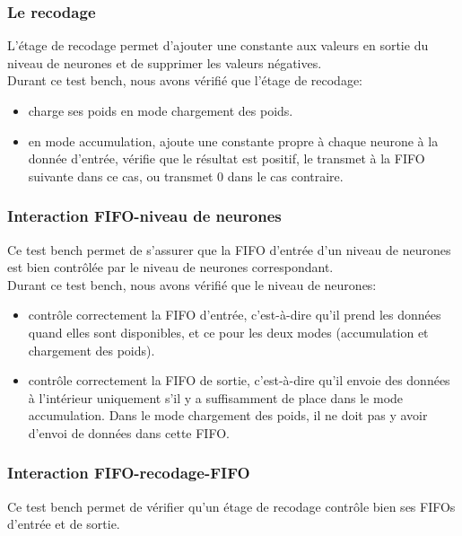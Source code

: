\subsubsection{Le recodage}

L'étage de recodage permet d'ajouter une constante aux valeurs en sortie du
niveau de neurones et de supprimer les valeurs négatives.\\

Durant ce test bench, nous avons vérifié que l'étage de recodage:
\begin{itemize}
	\item charge ses poids en mode chargement des poids.
	\item en mode accumulation, ajoute une constante propre à chaque neurone
	à la donnée d'entrée, vérifie que le résultat est positif, le transmet à
	la FIFO suivante dans ce cas, ou transmet 0 dans le cas contraire.
\end{itemize}

\subsubsection{Interaction FIFO-niveau de neurones}

Ce test bench permet de s'assurer que la FIFO d'entrée d'un niveau de neurones
est bien contrôlée par le niveau de neurones correspondant.\\

Durant ce test bench, nous avons vérifié que le niveau de neurones:
\begin{itemize}
	\item contrôle correctement la FIFO d'entrée, c'est-à-dire qu'il prend
	les données quand elles sont disponibles, et ce pour les deux modes
	(accumulation et chargement des poids).
	\item contrôle correctement la FIFO de sortie, c'est-à-dire qu'il envoie
	des données à l'intérieur uniquement s'il y a suffisamment de place dans
	le mode accumulation. Dans le mode chargement des poids, il ne doit pas
	y avoir d'envoi de données dans cette FIFO.
\end{itemize}

\subsubsection{Interaction FIFO-recodage-FIFO}

Ce test bench permet de vérifier qu'un étage de recodage contrôle bien ses FIFOs
d'entrée et de sortie.\\

